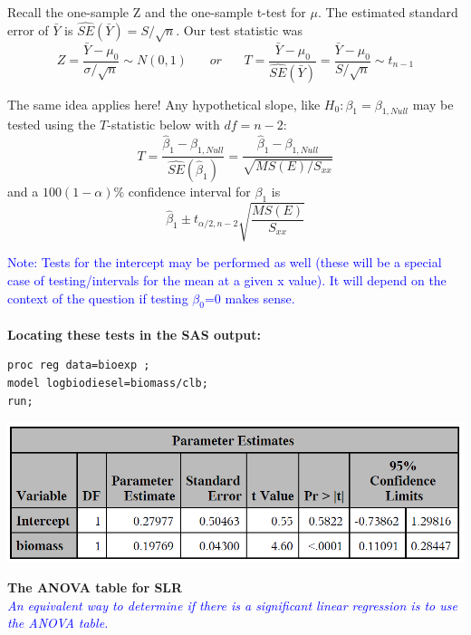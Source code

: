 \newpage

Recall the one-sample Z and the one-sample t-test for $\mu$.  The estimated standard error of $\bar{Y}$ is $\hat{SE}(\bar{Y})=S/\sqrt{n}$.  Our test statistic was
$$Z=\frac{\bar{Y}-\mu_0}{\sigma/\sqrt{n}}\sim N(0,1)~~~~~~~~or~~~~~~~~T=\frac{\bar{Y}-\mu_0}{\hat{SE}(\bar{Y})}=\frac{\bar{Y}-\mu_0}{S/\sqrt{n}}\sim t_{n-1}$$


The same idea applies here!  Any hypothetical slope, like $H_0:\beta_1=\beta_{1,Null}$ may be tested using the $T$-statistic below with $df=n-2$:
$$ T=\frac{\hat\beta_1-\beta_{1,Null}}{\widehat{SE}(\hat\beta_1)}=\frac{\hat\beta_1-\beta_{1,Null}}{\sqrt{MS(E)/S_{xx}}}$$ 
and a $100(1-\alpha)\%$ confidence interval for $\beta_1$ is
$$\hat{\beta}_1 \pm t_{\alpha/2,n-2} \sqrt{\frac{MS(E)}{S_{xx}}}$$

\textcolor{blue}{Note: Tests for the intercept may be performed as well (these will be a special case of testing/intervals for the mean at a given x value). It will depend on the context of the question if testing $\beta_0$=0 makes sense.}\\~\\

\Large\textbf{Locating these tests in the SAS output:}\large\\
\begin{small}
\begin{verbatim}
proc reg data=bioexp ;
model logbiodiesel=biomass/clb;
run;
\end{verbatim}
\end{small}
\begin{flushleft}
\includegraphics[scale=0.4]{SLRbiodieselparameterestimates}\\
\end{flushleft}

\newpage
\Large \textbf{The ANOVA table for SLR}\large\\
\textit{\textcolor{blue}{An equivalent way to determine if there is a significant linear regression is to use the ANOVA table.}}\\~\\


